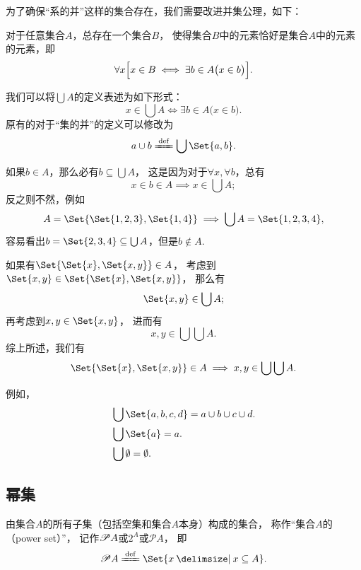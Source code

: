 为了确保“系的并”这样的集合存在，我们需要改进并集公理，如下：
\begin{axiom}[并集公理II]
对于任意集合\(A\)，总存在一个集合\(B\)，
使得集合\(B\)中的元素恰好是集合\(A\)中的元素的元素，即\[
	\forall x \Bigl[
		x \in B
		\iff
		\exists b \in A \bigl( x \in b \bigr)
	\Bigr].
\]
\end{axiom}

我们可以将\(\bigcup A\)的定义表述为如下形式：\[
	x \in \bigcup A
	\iff
	\exists b \in A \bigl( x \in b \bigr).
\]
原有的对于“集的并”的定义可以修改为\[
	a \cup b \defeq \bigcup\Set{a,b}.
\]

\begin{example}
如果\(b \in A\)，那么必有\(b \subseteq \bigcup A\)，
这是因为对于\(\forall x, \forall b\)，总有\[
	x \in b \in A
	\implies
	x \in \bigcup A;
\]
反之则不然，例如\[
	A = \Set{\Set{1,2,3},\Set{1,4}}
	\implies
	\bigcup A = \Set{1,2,3,4},
\]
容易看出\(b = \Set{2,3,4} \subseteq \bigcup A\)，但是\(b \notin A\).
\end{example}

\begin{example}\label{example:集合论.有序对各坐标的取值范围}
如果有\(\Set{ \Set{x}, \Set{x,y} } \in A\)，
考虑到\(\Set{x,y} \in \Set{ \Set{x}, \Set{x,y} }\)，
那么有\[
	\Set{x,y} \in \bigcup A;
\]
再考虑到\(x,y \in \Set{x,y}\)，
进而有\[
	x,y \in \bigcup\bigcup A.
\]
综上所述，我们有
\begin{equation}
	\Set{ \Set{x}, \Set{x,y} } \in A
	\implies
	x,y \in \bigcup\bigcup A.
\end{equation}
\end{example}

例如，
\begin{align*}
	&\bigcup\Set{a,b,c,d} = a \cup b \cup c \cup d. \\
	&\bigcup\Set{a} = a. \\
	&\bigcup\emptyset = \emptyset.
\end{align*}


\subsection{幂集}
\begin{definition}
由集合\(A\)的所有子集（包括空集和集合\(A\)本身）构成的集合，
称作“集合\(A\)的（power set）”，
记作\(\mathscr{P} A\)或\(2^A\)或\(\mathcal{P}A\)，
即\[
	\Powerset A
	\defeq
	\Set{ x \given x \subseteq A }.
\]
\end{definition}

